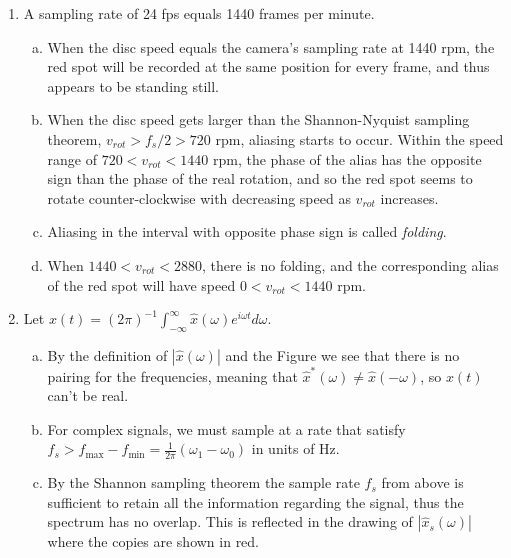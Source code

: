 \begin{enumerate}
  \item A sampling rate of 24 fps equals 1440 frames per minute.
        \begin{enumerate}[a)]
          \item When the disc speed equals the camera's sampling rate at 1440 rpm, the red spot will be 
                recorded at the same position for every frame, and thus appears to be standing still.
          \item When the disc speed gets larger than the Shannon-Nyquist sampling theorem, 
                $v_{rot} > f_s / 2 > 720$ rpm, aliasing starts to occur. Within the speed range of 
                $720 < v_{rot} < 1440$ rpm, the phase of the alias has the opposite sign than the phase 
                of the real rotation, and so the red spot seems to rotate counter-clockwise with 
                decreasing speed as $v_{rot}$ increases.
          \item Aliasing in the interval with opposite phase sign is called \emph{folding}.
          \item When $1440 < v_{rot} < 2880$, there is no folding, and the corresponding alias of 
          the red spot will have speed $0 < v_{rot} < 1440$ rpm.
        \end{enumerate}

  \item Let $x(t)=(2\pi)^{-1}\int_{-\infty}^{\infty}\hat{x}(\omega)e^{i\omega t}d\omega$.

        \begin{enumerate}[a)]
          \item By the definition of $|\hat{x}(\omega)|$ and the Figure we see that there is no pairing for 
                the frequencies, meaning that $\hat{x}^{*}(\omega)\neq \hat{x}(-\omega)$, so $x(t)$ can't be real.

          \item For complex signals, we must sample at a rate that satisfy 
                $f_{s}>f_{\text{max}}-f_{\text{min}}=\frac{1}{2\pi}(\omega_{1}-\omega_{0})$ in units of Hz.

          \item By the Shannon sampling theorem the sample rate $f_{s}$ from above is sufficient to 
                retain all the information regarding the signal,
                thus the spectrum has no overlap. This is reflected in the drawing of $|\hat{x}_{s}(\omega)|$ 
                where the copies are shown in red.


\end{enumerate}
\end{enumerate}
